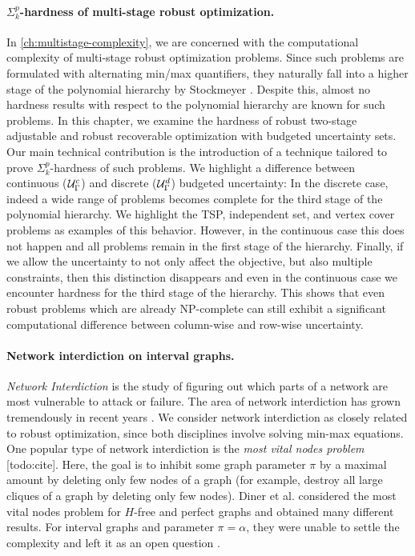 \paragraph*{$\Sigma^p_k$-hardness of multi-stage robust optimization.}
In \cref{ch:multistage-complexity}, we are concerned with the computational complexity of multi-stage robust optimization problems. Since such problems are formulated with alternating min/max quantifiers, they naturally fall into a higher stage of the polynomial hierarchy by Stockmeyer \cite{stockmeyer1976polynomial}. Despite this, almost no hardness results with respect to the polynomial hierarchy are known for such problems. In this chapter, we examine the hardness of robust two-stage adjustable and robust recoverable optimization with budgeted uncertainty sets. Our main technical contribution is the introduction of a technique tailored to prove $\Sigma^p_k$-hardness of such problems. We highlight a difference between continuous ($\mathcal{U}^c_\Gamma$) and discrete ($\mathcal{U}^d_\Gamma$) budgeted uncertainty: In the discrete case, indeed a wide range of problems becomes complete for the third stage of the polynomial hierarchy. We highlight the TSP, independent set, and vertex cover problems as examples of this behavior. However, in the continuous case this does not happen and all problems remain in the first stage of the hierarchy. Finally, if we allow the uncertainty to not only affect the objective, but also multiple constraints, then this distinction disappears and even in the continuous case we encounter hardness for the third stage of the hierarchy. This shows that even robust problems which are already NP-complete can still exhibit a significant computational difference between column-wise and row-wise uncertainty.

\paragraph*{Network interdiction on interval graphs.}
\emph{Network Interdiction} \cite{NetworkInterdictProblemsBookChapter} is the study of figuring out which parts of a network are most vulnerable to attack or failure. The area of network interdiction has grown tremendously in recent years \cite{criticalNodeDetectionSurvey}. 
We consider network interdiction as closely related to robust optimization, since both disciplines involve solving min-max equations. One popular type of network interdiction is the \emph{most vital nodes problem} [todo:cite]. Here, the goal is to inhibit some graph parameter $\pi$ by a maximal amount by deleting only few nodes of a graph (for example, destroy all large cliques of a graph by deleting only few nodes). Diner et al. \cite{diner2018contractionDeletionBlockers} considered the most vital nodes problem for $H$-free and perfect graphs and obtained many different results. For interval graphs and parameter $\pi = \alpha$, they were unable to settle the complexity and left it as an open question \cite[(Q2)]{diner2018contractionDeletionBlockers}.

